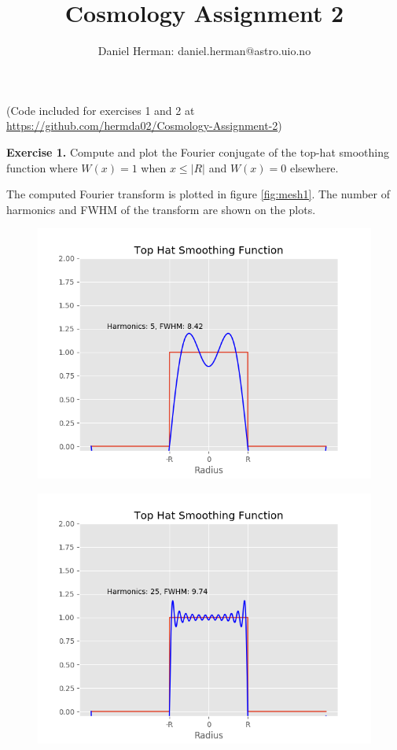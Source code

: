 \documentclass[a4paper]{article}
\title{Cosmology Assignment 2}
\author{Daniel Herman: daniel.herman@astro.uio.no}
\begin{document}
\begin{titlepage}
\maketitle
\end{titlepage}

(Code included for exercises 1 and 2 at \url{https://github.com/hermda02/Cosmology-Assignment-2})

\textbf{Exercise 1.}
Compute and plot the Fourier conjugate of the top-hat smoothing function where $W(x) = 1$ when $x \leq |R|$ and $W(x) = 0$ elsewhere. 

The computed Fourier transform is plotted in figure \ref{fig:mesh1}. The number of harmonics and FWHM of the transform are shown on the plots.

\begin{figure}[h]
\centering
\includegraphics[scale=0.45]{exercise1_5harm}
\end{figure}

\begin{figure}[h]
\centering
\includegraphics[scale=0.45]{exercise1_25harm}
\end{figure}
\end{document}
